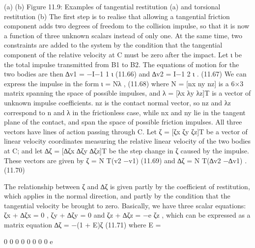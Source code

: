 (a) (b) Figure 11.9: Examples of tangential restitution (a) and torsional restitution (b) The first step is to realise that allowing a tangential friction component adds two degrees of freedom to the collision impulse, so that it is now a function of three unknown scalars instead of only one. At the same time, two constraints are added to the system by the condition that the tangential component of the relative velocity at C must be zero after the impact. Let ι be the total impulse transmitted from B1 to B2. The equations of motion for the two bodies are then ∆v1 = −I−1 1 ι (11.66) and ∆v2 = I−1 2 ι . (11.67) We can express the impulse in the form ι = Nλ , (11.68) where N = [nx ny nz] is a 6×3 matrix spanning the space of possible impulses, and λ = [λx λy λz]T is a vector of unknown impulse coefficients. nz is the contact normal vector, so nz and λz correspond to n and λ in the frictionless case, while nx and ny lie in the tangent plane of the contact, and span the space of possible friction impulses. All three vectors have lines of action passing through C. Let ζ = [ζx ζy ζz]T be a vector of linear velocity coordinates measuring the relative linear velocity of the two bodies at C; and let ∆ζ = [∆ζx ∆ζy ∆ζz]T be the step change in ζ caused by the impulse. These vectors are given by ζ = N T(v2 −v1) (11.69) and ∆ζ = N T(∆v2 −∆v1) . (11.70)

The relationship between ζ and ∆ζ is given partly by the coefficient of restitution, which applies in the normal direction, and partly by the condition that the tangential velocity be brought to zero. Basically, we have three scalar equations: ζx + ∆ζx = 0 , ζy + ∆ζy = 0 and ζz + ∆ζz = −e ζz , which can be expressed as a matrix equation ∆ζ = −(1 + E)ζ (11.71) where E =

0 0 0 0 0 0 0 0 e

